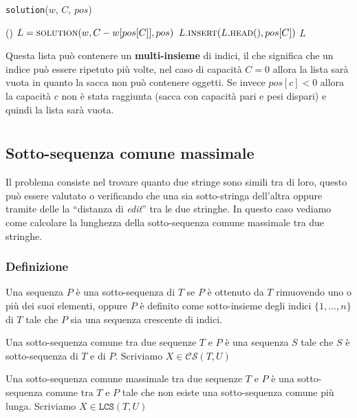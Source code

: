                 \begin{algorithm}[H]
                    \caption{\List \texttt{solution}(\Int[] $w$, \Int $C$, \Int[] $pos$)}
                    \begin{algorithmic}
                            \State \Return \List()
                        \EndIf
                        \State \List $L = \Call{solution}{w, C-w[pos[C]], pos}$
                        \State $L.\Call{insert}{L.\textsc{head}(), pos[C]}$
                        \State \Return $L$
                    \end{algorithmic}
                \end{algorithm}
                Questa lista può contenere un \textbf{multi-insieme} di indici, il che significa che un indice può essere ripetuto più volte, nel caso di capacità $C=0$ allora la lista sarà vuota in quanto la sacca non può contenere oggetti.
                Se invece $pos[c]<0$ allora la capacità $c$ non è stata raggiunta (sacca con capacità pari e pesi dispari) e quindi la lista sarà vuota.
\section{}
    \subsection{Sotto-sequenza comune massimale}
        Il problema consiste nel trovare quanto due stringe sono simili tra di loro, questo può essere valutato o verificando che una sia sotto-stringa dell'altra oppure tramite delle la ``distanza di \textit{edit}'' tra le due stringhe. In questo caso vediamo come calcolare la lunghezza della sotto-sequenza comune massimale tra due stringhe.
        \subsubsection{Definizione}
            Una sequenza $P$ è una sotto-sequenza di $T$ se $P$ è ottenuto da $T$ rimuovendo uno o più dei suoi elementi, oppure $P$ è definito come sotto-insieme degli indici $\{1,\dots,n\}$ di $T$ tale che $P$ sia una sequenza crescente di indici.
            \begin{definition}
                Una sotto-sequenza comune tra due sequenze $T$ e $P$ è una sequenza $S$ tale che $S$ è sotto-sequenza di $T$ e di $P$. Scriviamo $X \in\mathcal{CS}(T,U)$
            \end{definition}
            \begin{definition}
                Una sotto-sequenza comune massimale tra due sequenze $T$ e $P$ è una sotto-sequenza comune tra $T$ e $P$ tale che non esiste una sotto-sequenza comune più lunga. Scriviamo $X \in\mathcal{\texttt{LCS}}(T,U)$
            \end{definition}
